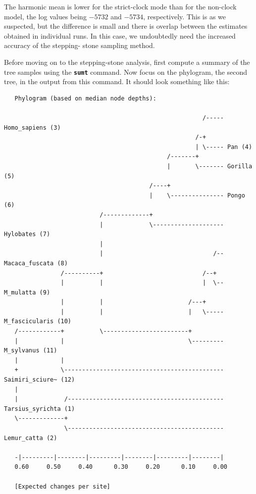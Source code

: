\documentclass[12pt]{book}
\newcommand{\ttt}[1]{\texttt{#1}}
\newcommand{\tb}[1]{\ttt{\textbf{#1}}}
\begin{document}
The harmonic mean is lower for the strict-clock mode than for the non-clock model, the log values
being $-5732$ and $-5734$, respectively. This is as we suspected, but the difference is small and
there is overlap between the estimates obtained in individual runs. In this case, we undoubtedly
need the increased accuracy of the stepping- stone sampling method.

Before moving on to the stepping-stone analysis, first compute a summary of the tree samples using
the \tb{sumt} command. Now focus on the phylogram, the second tree, in the output from this
command. It should look something like this:


\begin{singlespacing}
\scriptsize
\begin{verbatim}
   Phylogram (based on median node depths):

                                                        /----- Homo_sapiens (3)
                                                      /-+                          
                                                      | \----- Pan (4)
                                              /-------+                            
                                              |       \------- Gorilla (5)
                                         /----+                                    
                                         |    \--------------- Pongo (6)
                           /-------------+                                         
                           |             \-------------------- Hylobates (7)
                           |                                                       
                           |                               /-- Macaca_fuscata (8)
                /----------+                            /--+                       
                |          |                            |  \-- M_mulatta (9)
                |          |                        /---+                          
                |          |                        |   \----- M_fascicularis (10)
   /------------+          \------------------------+                              
   |            |                                   \--------- M_sylvanus (11)
   |            |                                                                  
   +            \--------------------------------------------- Saimiri_sciure~ (12)
   |                                                                               
   |             /-------------------------------------------- Tarsius_syrichta (1)
   \-------------+                                                                 
                 \-------------------------------------------- Lemur_catta (2)
                                                                                   
   -|---------|--------|---------|--------|---------|--------|                     
   0.60     0.50     0.40      0.30     0.20      0.10     0.00                    

   [Expected changes per site]
\end{verbatim}
\normalsize
\end{singlespacing}
\end{document}
